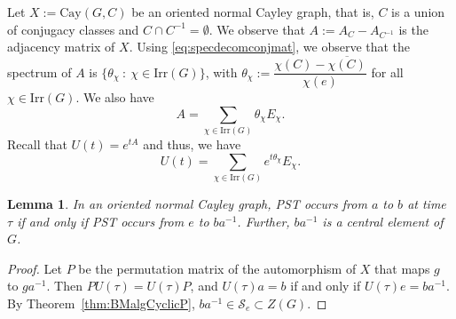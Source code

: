 \documentclass{amsart}
\theoremstyle{plain}
\newtheorem{lemma}[theorem]{Lemma}
\theoremstyle{remark}\newtheorem{con}[theorem]{Construction}
\theoremstyle{remark} \newtheorem*{remark}{Remark}
\theoremstyle{remark} \newtheorem{example}{Example}
\newcommand{\mrm}{\mathrm}
\newcommand{\ov}{\overline}
\newcommand{\irr}{\mathrm{Irr}}
\newcommand{\cS}{\mathcal{S}}
\begin{document}
Let $X:=\mrm{Cay}(G, C)$ be an oriented normal Cayley graph, that is, $C$ is a union of conjugacy classes and $C \cap C^{-1}=\emptyset$. We observe that $A:=A_{C}- A_{C^{-1}}$ is the adjacency matrix of $X$. Using \eqref{eq:specdecomconjmat}, we observe that the spectrum of $A$ is 
$\{\theta_{\chi}\ :\ \chi \in \irr(G)\}$, with $\theta_{\chi} := \dfrac{\chi(C)-\ov{\chi(C)}}{\chi(e)}$ for all $\chi \in \irr(G)$. We also have 
\begin{equation}\label{eq:idempdecom}
A = \sum\limits_{\chi \in \irr(G)} \theta_{\chi} E_{\chi}.
\end{equation} 
Recall that $U(t)=e^{tA}$ and thus, we have 
\begin{equation}\label{eq:idempdecomtmat}
U(t) = \sum\limits_{\chi \in \irr(G)} e^{t\theta_{\chi}} E_{\chi}.
\end{equation} 

\begin{lemma}\label{lem:PSTequiv}
In an oriented normal Cayley graph,
PST occurs from $a$ to $b$ at time $\tau$ if and only if PST occurs from $e$ to $ba^{-1}$.
Further, $ba^{-1}$ is a central element of $G$.
\end{lemma}
\begin{proof}
Let $P$ be the permutation matrix of the automorphism of $X$ that maps $g$ to $ga^{-1}$.
Then $PU(\tau)=U(\tau)P$, and $U(\tau)a=b$ if and only if $U(\tau)e=ba^{-1}$.  
By Theorem~\ref{thm:BMalgCyclicP}, $ba^{-1} \in \cS_e \subset Z(G)$.   
\end{proof}
\end{document}
